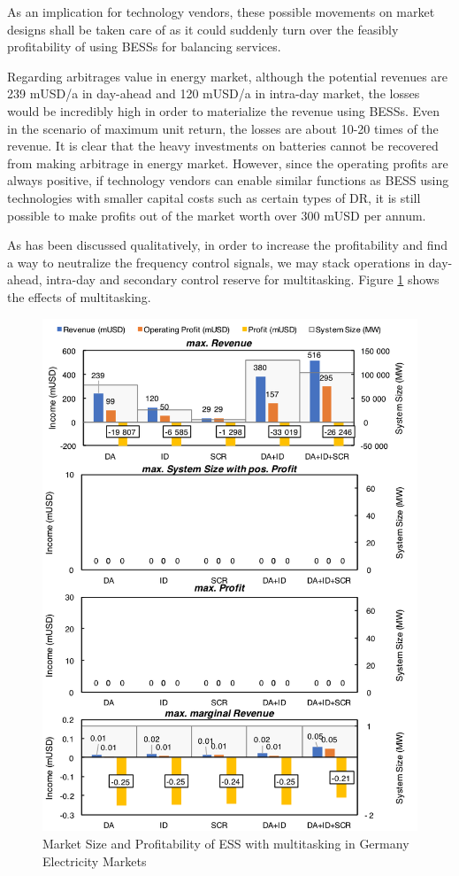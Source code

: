 As an implication for technology vendors, these possible movements on market designs shall be taken care of as it could suddenly turn over the feasibly profitability of using BESSs for balancing services.

Regarding arbitrages value in energy market, although the potential revenues are 239 mUSD/a in day-ahead and 120 mUSD/a in intra-day market, the losses would be incredibly high in order to materialize the revenue using BESSs. Even in the scenario of maximum unit return, the losses are about 10-20 times of the revenue. It is clear that the heavy investments on batteries cannot be recovered from making arbitrage in energy market. However, since the operating profits are always positive, if technology vendors can enable similar functions as BESS using technologies with smaller capital costs such as certain types of DR, it is still possible to make profits out of the market worth over 300 mUSD per annum.

As has been discussed qualitatively, in order to increase the profitability and find a way to neutralize the frequency control signals, we may stack operations in day-ahead, intra-day and secondary control reserve for multitasking. Figure \ref{fig:germany-ess-multitasking} shows the effects of multitasking.

\begin{figure}[h!]
	\centering
	\includegraphics[width=0.95\linewidth]{Figures/Germany_ESS_multitasking}
	\caption{Market Size and Profitability of ESS with multitasking in Germany Electricity Markets}
	\label{fig:germany-ess-multitasking}
\end{figure}

